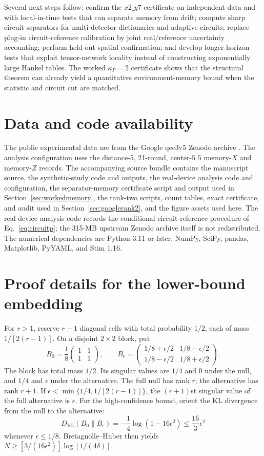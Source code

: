 \documentclass[11pt]{article}
\begin{document}
Several next steps follow: confirm the $x2\_y7$ certificate on independent data and with local-in-time tests that can separate memory from drift; compute sharp circuit separators for multi-detector dictionaries and adaptive circuits; replace plug-in circuit-reference calibration by joint real/reference uncertainty accounting; perform held-out spatial confirmation; and develop longer-horizon tests that exploit tensor-network locality instead of constructing exponentially large Hankel tables. The worked $\kappa_\Gamma=2$ certificate shows that the structural theorem can already yield a quantitative environment-memory bound when the statistic and circuit cut are matched.

\section*{Data and code availability}
The public experimental data are from the Google qec3v5 Zenodo archive \cite{google2022data}. The analysis configuration uses the distance-5, 21-round, center-$5\_5$ memory-$X$ and memory-$Z$ records. The accompanying source bundle contains the manuscript source, the synthetic-study code and outputs, the real-device analysis code and configuration, the separator-memory certificate script and output used in Section~\ref{sec:workedmemory}, the rank-two scripts, count tables, exact certificate, and audit used in Section~\ref{sec:googlerank2}, and the figure assets used here. The real-device analysis code records the conditional circuit-reference procedure of Eq.~\eqref{eq:circuitp}; the 315-MB upstream Zenodo archive itself is not redistributed. The numerical dependencies are Python 3.11 or later, NumPy, SciPy, pandas, Matplotlib, PyYAML, and Stim 1.16.

\appendix
\section{Proof details for the lower-bound embedding}
For $r>1$, reserve $r-1$ diagonal cells with total probability $1/2$, each of mass $1/[2(r-1)]$. On a disjoint $2\times2$ block, put
\[
B_0=\frac18\begin{pmatrix}1&1\\1&1\end{pmatrix},\qquad
B_\epsilon=\begin{pmatrix}1/8+\epsilon/2&1/8-\epsilon/2\\1/8-\epsilon/2&1/8+\epsilon/2\end{pmatrix}.
\]
The block has total mass $1/2$. Its singular values are $1/4$ and $0$ under the null, and $1/4$ and $\epsilon$ under the alternative. The full null has rank $r$; the alternative has rank $r+1$. If $\epsilon<\min\{1/4,1/[2(r-1)]\}$, the $(r+1)$st singular value of the full alternative is $\epsilon$. For the high-confidence bound, orient the KL divergence from the null to the alternative:
\[
D_{\mathrm{KL}}(B_0\|B_\epsilon)
=-\frac14\log(1-16\epsilon^2)
\le \frac{16}{3}\epsilon^2
\]
whenever $\epsilon\le1/8$. Bretagnolle--Huber then yields
$N\ge[3/(16\epsilon^2)]\log[1/(4\delta)]$.
\end{document}
